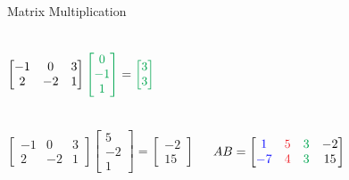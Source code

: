 \documentclass[xcolor=dvipsnames,aspectratio=169,t]{beamer}
\begin{document}
\begin{frame}{Matrix Multiplication}
\begin{columns}[T]
\column{0.33\tw}
\[  \begin{bmatrix} -1 & 0 & 3\\ 2 & -2 & 1 \end{bmatrix} \colorg{\begin{bmatrix}0\\-1\\1 \end{bmatrix}} = \colorg{\begin{bmatrix} 3\\ 3 \end{bmatrix}} \]
\end{columns}

\begin{columns}

\column{0.33\tw}
\[  \begin{bmatrix} -1 & 0 & 3\\ 2 & -2 & 1 \end{bmatrix} \begin{bmatrix}5\\-2\\1 \end{bmatrix} = \begin{bmatrix} -2\\ 15 \end{bmatrix} \]

\column{0.67\tw}

\[ AB = \begin{bmatrix} \colorb{1} & \colorr{5} & \colorg{3} & -2 \\ \colorb{-7} & \colorr{4} & \colorg{3} & 15\end{bmatrix} \]

\end{columns}

\end{frame}
\end{document}
